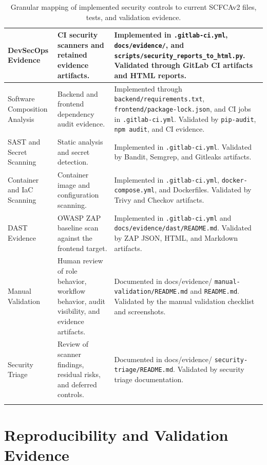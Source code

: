 \documentclass[12pt,a4paper]{report}
\begin{document}
\begin{longtable}{|p{3.0cm}|p{5.0cm}|p{7.0cm}|}
DevSecOps Evidence & CI security scanners and retained evidence artifacts. &
Implemented in \texttt{.gitlab-ci.yml}, \texttt{docs/evidence/}, and \texttt{scripts/security\_reports\_to\_html.py}. Validated through GitLab CI artifacts and HTML reports. \\
\hline

Software Composition Analysis & Backend and frontend dependency audit evidence. &
Implemented through \texttt{backend/requirements.txt}, \texttt{frontend/package-lock.json}, and CI jobs in \texttt{.gitlab-ci.yml}. Validated by \texttt{pip-audit}, \texttt{npm audit}, and CI evidence. \\
\hline

SAST and Secret Scanning & Static analysis and secret detection. &
Implemented in \texttt{.gitlab-ci.yml}. Validated by Bandit, Semgrep, and Gitleaks artifacts. \\
\hline

Container and IaC Scanning & Container image and configuration scanning. &
Implemented in \texttt{.gitlab-ci.yml}, \texttt{docker-compose.yml}, and Dockerfiles. Validated by Trivy and Checkov artifacts. \\
\hline

DAST Evidence & OWASP ZAP baseline scan against the frontend target. &
Implemented in \texttt{.gitlab-ci.yml} and \texttt{docs/evidence/dast/README.md}. Validated by ZAP JSON, HTML, and Markdown artifacts. \\
\hline

Manual Validation & Human review of role behavior, workflow behavior, audit visibility, and evidence artifacts. &
Documented in docs/evidence/
\texttt{manual-validation/README.md} 
and \texttt{README.md}. Validated by the manual validation checklist and screenshots. \\
\hline

Security Triage & Review of scanner findings, residual risks, and deferred controls. &
Documented in docs/evidence/ \texttt{security-triage/README.md}. Validated by security triage documentation. \\
\hline

\caption{Granular mapping of implemented security controls to current SCFCAv2 files, tests, and validation evidence.}
\label{tab:granular-security-mapping}
\end{longtable}

\endgroup

\chapter {Reproducibility and Validation Evidence}
\label{app:reproducibility-validation-evidence}
\end{document}
